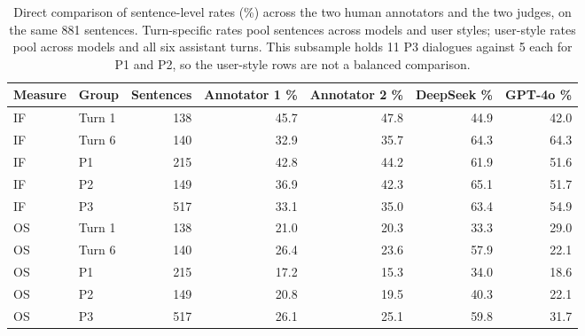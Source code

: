 \begin{table}[t]
\centering
\small
\caption{Direct comparison of sentence-level rates (\%) across the two human annotators and the two judges, on the same 881 sentences. Turn-specific rates pool sentences across models and user styles; user-style rates pool across models and all six assistant turns. This subsample holds 11 P3 dialogues against 5 each for P1 and P2, so the user-style rows are not a balanced comparison.}
\label{tab:human_aggregate_patterns}
\begin{tabular}{llrrrrr}
\toprule
Measure & Group & Sentences & Annotator 1 \% & Annotator 2 \% & DeepSeek \% & GPT-4o \% \\
\midrule
IF & Turn 1 & 138 & 45.7 & 47.8 & 44.9 & 42.0 \\
IF & Turn 6 & 140 & 32.9 & 35.7 & 64.3 & 64.3 \\
IF & P1 & 215 & 42.8 & 44.2 & 61.9 & 51.6 \\
IF & P2 & 149 & 36.9 & 42.3 & 65.1 & 51.7 \\
IF & P3 & 517 & 33.1 & 35.0 & 63.4 & 54.9 \\
OS & Turn 1 & 138 & 21.0 & 20.3 & 33.3 & 29.0 \\
OS & Turn 6 & 140 & 26.4 & 23.6 & 57.9 & 22.1 \\
OS & P1 & 215 & 17.2 & 15.3 & 34.0 & 18.6 \\
OS & P2 & 149 & 20.8 & 19.5 & 40.3 & 22.1 \\
OS & P3 & 517 & 26.1 & 25.1 & 59.8 & 31.7 \\
\bottomrule
\end{tabular}
\end{table}
